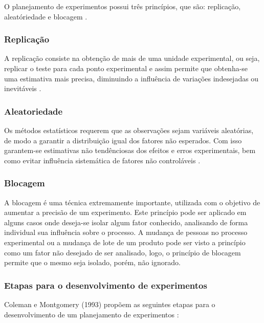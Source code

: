 O planejamento de experimentos possui três princípios, que são: replicação, aleatóriedade e blocagem \cite{2}. 

\subsubsection*{Replicação}

A replicação consiste na obtenção de mais de uma unidade experimental, ou seja, replicar o teste para cada ponto experimental e assim permite que obtenha-se uma estimativa mais precisa, diminuindo a influência de variações indesejadas ou inevitáveis \cite{2}.

\subsubsection*{Aleatoriedade}

Os métodos estatísticos requerem que as observações sejam variáveis aleatórias, de modo a garantir a distribuição igual dos fatores não esperados. Com isso garantem-se estimativas não tendênciosas dos efeitos e erros experimentais, bem como evitar influência sistemática de fatores não controláveis \cite{2}. 
\subsubsection*{Blocagem}

A blocagem é uma técnica extremamente importante, utilizada com o objetivo de aumentar a precisão de um experimento. Este princípio pode ser aplicado em alguns casos onde deseja-se isolar algum fator conhecido, analisando de forma individual sua influência sobre o processo. A mudança de pessoas no processo experimental ou a mudança de lote de um produto pode ser visto a princípio como um fator não desejado de ser analisado, logo, o princípio de blocagem permite que o mesmo seja isolado, porém, não ignorado\cite{2}. 

\subsubsection{Etapas para o desenvolvimento de experimentos}
\label{subsec:etapas}

Coleman e Montgomery (1993) propõem as seguintes etapas para o desenvolvimento de um planejamento de experimentos \cite{3}:

